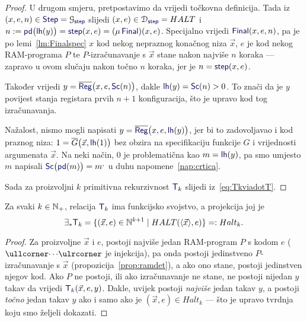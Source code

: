 \begin{proof}
U drugom smjeru, pretpostavimo da vrijedi točkovna definicija. Tada iz $(x,e,n)\in\f{Step}=\graf{\f{step}}$ slijedi $(x,e)\in\dom{\f{step}}=HALT$ i $n:=\f{pd}\bigl(\f{lh}(y)\bigr)=\f{step}(x,e)=(\mu\,\f{Final})(x,e)$. Specijalno vrijedi $\f{Final}(x,e,n)$, pa je po lemi~\ref{lm:Finalspec} $x$ kod nekog nepraznog konačnog niza $\vec x$, $e$ je kod nekog RAM-programa $P$ te $P$-izračunavanje s $\vec x$ stane nakon najviše $n$ koraka --- zapravo u ovom slučaju nakon točno $n$ koraka, jer je $n=\f{step}(x,e)$.

Također vrijedi $y=\overline{\f{Reg}}\bigl(x,e,\f{Sc}(n)\bigr)$, dakle $\f{lh}(y)=\f{Sc}(n)>0$. To znači da je $y$ povijest stanja registara prvih $n+1$ konfiguracija, što je upravo kod tog izračunavanja.

    Nažalost, nismo mogli napisati $y=\overline{\f{Reg}}\bigl(x,e,\f{lh}(y)\bigr)$, jer bi to zadovoljavao i kod praznog niza: $1=\overline G\bigl(\vec x,\f{lh}(1)\bigr)$ bez obzira na specifikaciju funkcije $G$ i vrijednosti argumenata $\vec x$. Na neki način, $0$ je problematična kao $m=\f{lh}(y)$, pa smo umjesto $m$ napisali $\f{Sc}\bigl(\f{pd}(m)\bigr)=m\bump$ u duhu napomene~\ref{nap:crtica}.

Sada za proizvoljni $k$ primitivna rekurzivnost $\f T_k$ slijedi iz~\eqref{eq:TkviadotT}.
\end{proof}

\begin{korolar}[{name=[funkcijsko svojstvo i projekcija Kleenejeve relacije]}]\label{kor:funHaltTk}
    Za svaki $k\in{\mathbb N}_+$, relacija $\f T_k$ ima funkcijsko svojstvo, a projekcija joj je
    \begin{equation}
        \exists_*\f T_k=\{(\vec x,e)\in\N^{k+1}\mid HALT(\langle\vec x\rangle,e)\}=:Halt_k\text.
    \end{equation}
\end{korolar}
\begin{proof}
Za proizvoljne $\vec x$ i $e$, postoji najviše jedan RAM-program $P$ s kodom $e$ ($\kprog{\cdots}$ je injekcija), pa onda postoji jedinstveno $P$-izračunavanje s $\vec x$ (propozicija~\ref{prop:ramdet}), a ako ono stane, postoji jedinstven njegov kod. Ako $P$ ne postoji, ili ako izračunavanje ne stane, ne postoji nijedan $y$ takav da vrijedi $\f T_k(\vec x,e,y)$. Dakle, uvijek postoji \emph{najviše} jedan takav $y$, a postoji \emph{točno} jedan takav $y$ ako i samo ako je $(\vec x,e)\in Halt_k$ --- što je upravo tvrdnja koju smo željeli dokazati.
\end{proof}

